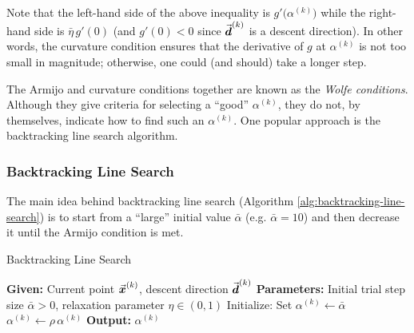 Note that the left-hand side of the above inequality is \(g'\bigl(\alpha^{(k)}\bigr)\) while the right-hand side is \(\bar{\eta}\,g'(0)\) (and \(g'(0) < 0\) since \(\vec{\boldsymbol{d}}^{(k)}\) is a descent direction). In other words, the curvature condition ensures that the derivative of \(g\) at \(\alpha^{(k)}\) is not too small in magnitude; otherwise, one could (and should) take a longer step.

The Armijo and curvature conditions together are known as the \emph{Wolfe conditions}. Although they give criteria for selecting a “good” \(\alpha^{(k)}\), they do not, by themselves, indicate how to find such an \(\alpha^{(k)}\). One popular approach is the backtracking line search algorithm.


\subsubsection{Backtracking Line Search}

The main idea behind backtracking line search (Algorithm \ref{alg:backtracking-line-search}) is to start from a “large” initial value \(\bar{\alpha}\) (e.g. \(\bar{\alpha}=10\)) and then decrease it until the Armijo condition is met.

\begin{algorithm}[h]
\caption{Backtracking Line Search}\label{alg:backtracking-line-search}
\begin{algorithmic}[1]
    \State \textbf{Given:} Current point \(\vec{\boldsymbol{x}}^{(k)}\), descent direction \(\vec{\boldsymbol{d}}^{(k)}\)
    \State \textbf{Parameters:} Initial trial step size \(\bar{\alpha} > 0\), relaxation parameter \(\eta \in (0,1)\)
    \State Initialize: Set \(\alpha^{(k)} \leftarrow \bar{\alpha}\)
        \State \(\alpha^{(k)} \leftarrow \rho\,\alpha^{(k)}\) 
    \EndWhile
    \State \textbf{Output:} \(\alpha^{(k)}\)
\end{algorithmic}
\end{algorithm}

